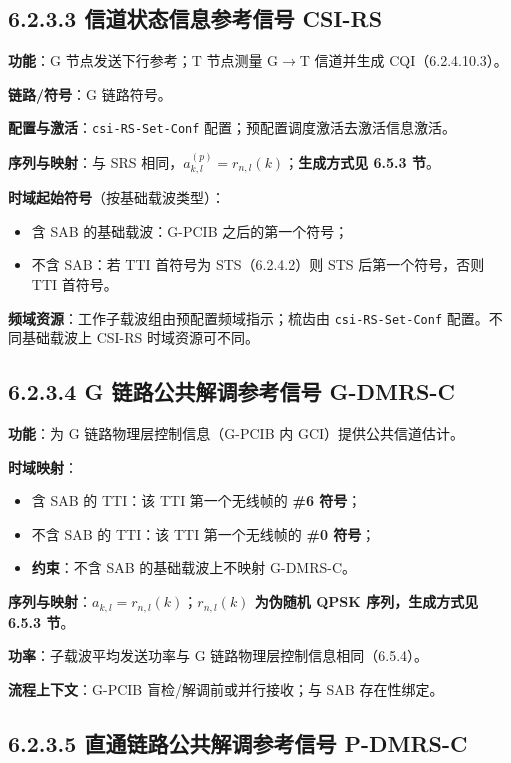\documentclass[11pt,a4paper]{ctexart}
\begin{document}
\subsection{6.2.3.3 信道状态信息参考信号 CSI-RS}

\textbf{功能}：G 节点发送下行参考；T 节点测量 G$\rightarrow$T 信道并生成 CQI（6.2.4.10.3）。

\textbf{链路/符号}：G 链路符号。

\textbf{配置与激活}：\texttt{csi-RS-Set-Conf} 配置；预配置调度激活去激活信息激活。

\textbf{序列与映射}：与 SRS 相同，$a_{k,l}^{(p)}=r_{n,l}(k)$；\textbf{生成方式见 6.5.3 节}。

\textbf{时域起始符号}（按基础载波类型）：
\begin{itemize}[nosep]
  \item 含 SAB 的基础载波：G-PCIB 之后的第一个符号；
  \item 不含 SAB：若 TTI 首符号为 STS（6.2.4.2）则 STS 后第一个符号，否则 TTI 首符号。
\end{itemize}

\textbf{频域资源}：工作子载波组由预配置频域指示；梳齿由 \texttt{csi-RS-Set-Conf} 配置。不同基础载波上 CSI-RS 时域资源可不同。

\subsection{6.2.3.4 G 链路公共解调参考信号 G-DMRS-C}

\textbf{功能}：为 G 链路物理层控制信息（G-PCIB 内 GCI）提供公共信道估计。

\textbf{时域映射}：
\begin{itemize}[nosep]
  \item 含 SAB 的 TTI：该 TTI 第一个无线帧的 \textbf{\#6 符号}；
  \item 不含 SAB 的 TTI：该 TTI 第一个无线帧的 \textbf{\#0 符号}；
  \item \textbf{约束}：不含 SAB 的基础载波上不映射 G-DMRS-C。
\end{itemize}

\textbf{序列与映射}：$a_{k,l}=r_{n,l}(k)$；\textbf{$r_{n,l}(k)$ 为伪随机 QPSK 序列，生成方式见 6.5.3 节}。

\textbf{功率}：子载波平均发送功率与 G 链路物理层控制信息相同（6.5.4）。

\textbf{流程上下文}：G-PCIB 盲检/解调前或并行接收；与 SAB 存在性绑定。

\subsection{6.2.3.5 直通链路公共解调参考信号 P-DMRS-C}
\end{document}
